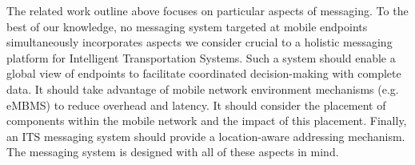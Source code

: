 The related work outline above focuses on particular aspects of
messaging.  To the best of our knowledge, no messaging system targeted
at mobile endpoints simultaneously incorporates aspects we consider
crucial to a holistic messaging platform for Intelligent
Transportation Systems.  Such a system should enable a global view of
endpoints to facilitate coordinated decision-making with complete
data. It should take advantage of mobile network environment
mechanisms (e.g. eMBMS) to reduce overhead and latency. It should
consider the placement of components within the mobile network and the
impact of this placement.  Finally, an ITS messaging system should
provide a location-aware addressing mechanism. The \name messaging
system is designed with all of these aspects in mind.
